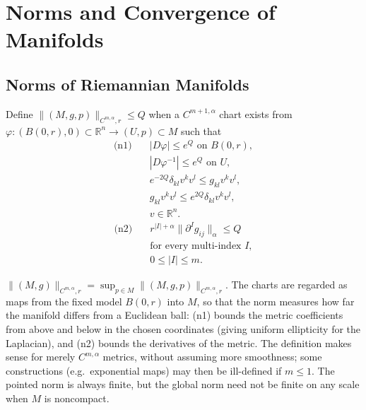 \section{Norms and Convergence of Manifolds}

\subsection{Norms of Riemannian Manifolds}

\begin{definition}
  \label{def:pet-ch11-cmalpha-norm-pointed}

  Define $\|(M,g,p)\|_{C^{m,\alpha},r}\le Q$ when a $C^{m+1,\alpha}$ chart
  exists from $\varphi:(B(0,r),0)\subset\mathbb{R}^n\to(U,p)\subset M$ such
  that
  \begin{equation}
    \begin{aligned}
      \text{(n1)}\quad
      &|D\varphi|\le e^Q\text{ on }B(0,r),\\
      &|D\varphi^{-1}|\le e^Q\text{ on }U,\\
      &e^{-2Q}\delta_{kl}v^kv^l\le g_{kl}v^kv^l,\\
      &g_{kl}v^kv^l\le e^{2Q}\delta_{kl}v^kv^l,\\
      &v\in\mathbb{R}^n.
    \end{aligned}
  \end{equation}
  \begin{equation}
    \begin{aligned}
      \text{(n2)}\quad
      &r^{|I|+\alpha}\|\partial^Ig_{ij}\|_\alpha\le Q\\
      &\text{for every multi-index }I,\\
      &0\le|I|\le m.
    \end{aligned}
  \end{equation}
\end{definition}

\begin{definition}
  \label{def:pet-ch11-cmalpha-norm-global}

  $\|(M,g)\|_{C^{m,\alpha},r}=\sup_{p\in M}\|(M,g,p)\|_{C^{m,\alpha},r}$. The
  charts are regarded as maps from the fixed model $B(0,r)$ into $M$, so that
  the norm measures how far the manifold differs from a Euclidean ball: (n1)
  bounds the metric coefficients from above and below in the chosen
  coordinates (giving uniform ellipticity for the Laplacian), and (n2)
  bounds the derivatives of the metric. The definition makes sense for
  merely $C^{m,\alpha}$ metrics, without assuming more smoothness; some
  constructions (e.g.\ exponential maps) may then be ill-defined if $m\le1$.
  The pointed norm is always finite, but the global norm need not be finite
  on any scale when $M$ is noncompact.
\end{definition}

